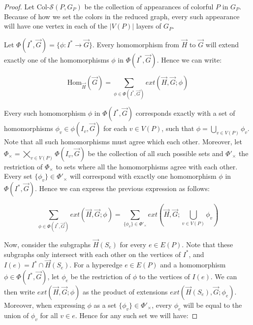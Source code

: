 \documentclass[a4paper,UKenglish,cleveref, autoref, numberwithinsect, thm-restate]{lipics-v2021}
\newcommand{\reduced}[1]{G_{#1}}
\newcommand{\colSetSub}{\text{Col-}\cS}
\newcommand{\extension}[3]{ext\left(#1,#2;#3\right)}
\newcommand{\Hom}[2]{\mathrm{Hom}_{#2}(#1)}
\newcommand{\cS}{\mathcal{S}}
\begin{document}
	\equivalence*
	\begin{proof}
		
		Let $\colSetSub(P,\reduced{P})$ be the collection of appearances of colorful $P$ in $\reduced{P}$. Because of how we set the colors in the reduced graph, every such appearance will have one vertex in each of the $|V(P)|$ layers of $\reduced{P}$.
		
		Let $\Phi(I^*,\vec{G}) = \{\phi: I^* \to \vec{G}\}$. Every homomorphism from $\vec{H}$ to $\vec{G}$ will extend exactly one of the homomorphisms $\phi$ in $\Phi(I^*,\vec{G})$. Hence we can write:
		
		\begin{equation} \label{eq:step0}
			\Hom{\vec{G}}{\vec{H}} = \sum_{\phi \in \Phi(I^*,\vec{G})} \extension{\vec{H}}{\vec{G}}{\phi}
		\end{equation}
		
		 Every such homomorphism $\phi$ in $\Phi(I^*,\vec{G})$ corresponds exactly with a set of homomorphisms $\phi_v \in \phi(I_v, \vec{G})$ for each $v \in V(P)$, such that $\phi = \bigcup_{v \in V(P)} \phi_v$. Note that all such homomorphisms must agree which each other. Moreover, let $\Phi_\times = \bigtimes_{v \in V(P)}{\Phi(I_v,\vec{G})}$ be the collection of all such possible sets and $\Phi'_\times$ the restriction of $\Phi_\times$ to sets where all the homomorphisms agree with each other. Every set $\{\phi_v\} \in \Phi'_\times$ will correspond with exactly one homomorphism $\phi$ in $\Phi(I^*,\vec{G})$. Hence we can express the previous expression as follows:
		
		\begin{equation} \label{eq:step1}\sum_{\phi \in \Phi(I^*,\vec{G})} \extension{\vec{H}}{\vec{G}}{\phi} = \sum_{\{\phi_v \} \in \Phi'_\times }
			\extension{\vec{H}}{\vec{G}}{\bigcup_{v \in V(P)} \phi_v}
		\end{equation}
		
		Now, consider the subgraphs $\vec{H}(S_e)$ for every $e \in E(P)$. Note that these subgraphs only intersect with each other on the vertices of $I^*$, and $I(e) = I^* \cap \vec{H}(S_e)$. For a hyperedge $e \in E(P)$ and a homomorphism $\phi \in \Phi(I^*,\vec{G})$, let $\phi_e$ be the restriction of $\phi$ to the vertices of $I(e)$. We can then write $\extension{\vec{H}}{\vec{G}}{\phi}$ as the product of extensions $\extension{\vec{H}(S_e)}{\vec{G}}{\phi_e}$. Moreover, when expressing $\phi$ as a set $\{\phi_v \} \in \Phi'_\times$, every $\phi_e$ will be equal to the union of $\phi_v$ for all $v \in e$. Hence for any such set we will have:
		

\end{proof}
\end{document}
